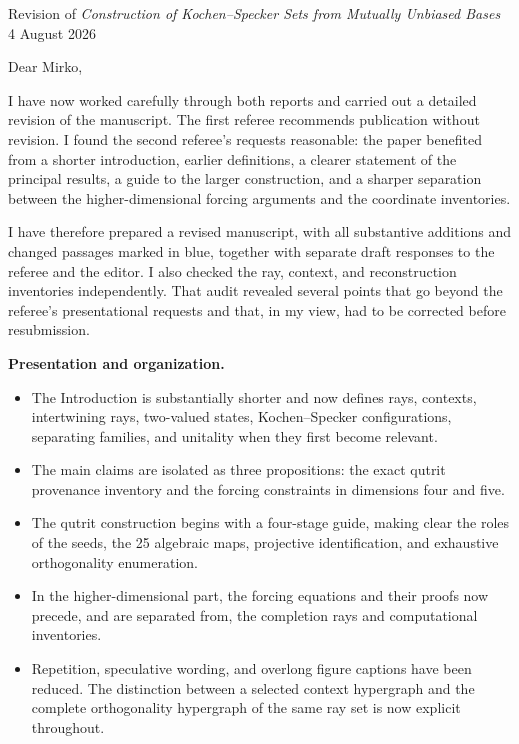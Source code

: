 \documentclass[11pt]{article}
\begin{document}
\begin{center}
{\Large Revision of \emph{Construction of Kochen--Specker Sets from Mutually Unbiased Bases}}\\[0.5em]
{\small 4 August 2026}
\end{center}

Dear Mirko,

I have now worked carefully through both reports and carried out a detailed revision of the manuscript.  The first referee recommends publication without revision.  I found the second referee's requests reasonable: the paper benefited from a shorter introduction, earlier definitions, a clearer statement of the principal results, a guide to the larger construction, and a sharper separation between the higher-dimensional forcing arguments and the coordinate inventories.

I have therefore prepared a revised manuscript, with all substantive additions and changed passages marked in blue, together with separate draft responses to the referee and the editor.  I also checked the ray, context, and reconstruction inventories independently.  That audit revealed several points that go beyond the referee's presentational requests and that, in my view, had to be corrected before resubmission.

\textbf{Presentation and organization.}
\begin{itemize}
\item The Introduction is substantially shorter and now defines rays, contexts, intertwining rays, two-valued states, Kochen--Specker configurations, separating families, and unitality when they first become relevant.
\item The main claims are isolated as three propositions: the exact qutrit provenance inventory and the forcing constraints in dimensions four and five.
\item The qutrit construction begins with a four-stage guide, making clear the roles of the seeds, the 25 algebraic maps, projective identification, and exhaustive orthogonality enumeration.
\item In the higher-dimensional part, the forcing equations and their proofs now precede, and are separated from, the completion rays and computational inventories.
\item Repetition, speculative wording, and overlong figure captions have been reduced.  The distinction between a selected context hypergraph and the complete orthogonality hypergraph of the same ray set is now explicit throughout.
\end{itemize}
\end{document}
